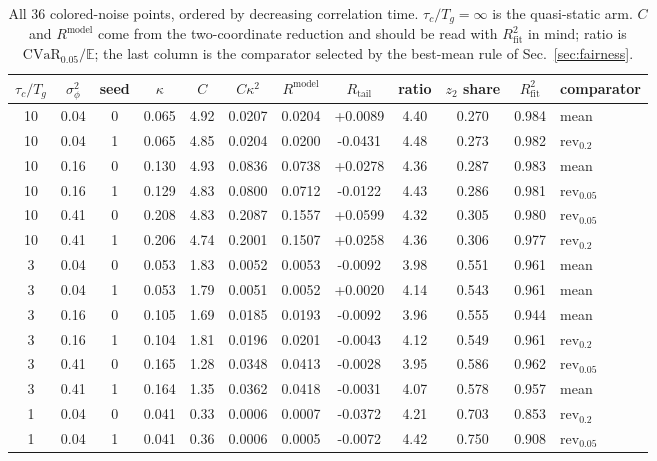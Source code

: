 \documentclass[aps,pra,onecolumn,notitlepage,superscriptaddress,nofootinbib,floatfix]{revtex4-2}
\newcommand{\cvar}{\mathrm{CVaR}}
\newcommand{\E}{\mathbb{E}}
\newcommand{\Rt}{R_{\mathrm{tail}}}
\newcommand{\Rm}{R^{\mathrm{model}}}
\begin{document}
\begin{table}[t]
\caption{All $36$ colored-noise points, ordered by decreasing correlation
time. $\tau_c/T_g=\infty$ is the quasi-static arm. $C$ and $\Rm$ come from the
two-coordinate reduction and should be read with $R^2_{\mathrm{fit}}$ in mind;
ratio is $\cvar_{0.05}/\E$; the last column is the comparator selected by the
best-mean rule of Sec.~\ref{sec:fairness}.}
\label{tab:stage4}
\begin{ruledtabular}
\begin{tabular}{ccccccccccc l}
$\tau_c/T_g$ & $\sigma_\phi^2$ & seed & $\kappa$ & $C$ & $C\kappa^2$ &
$\Rm$ & $\Rt$ & ratio & $z_2$ share & $R^2_{\mathrm{fit}}$ & comparator\\
\hline
10 & 0.04 & 0 & 0.065 & 4.92 & 0.0207 & 0.0204 & +0.0089 & 4.40 & 0.270 & 0.984 & mean\\
10 & 0.04 & 1 & 0.065 & 4.85 & 0.0204 & 0.0200 & -0.0431 & 4.48 & 0.273 & 0.982 & rev$_{0.2}$\\
10 & 0.16 & 0 & 0.130 & 4.93 & 0.0836 & 0.0738 & +0.0278 & 4.36 & 0.287 & 0.983 & mean\\
10 & 0.16 & 1 & 0.129 & 4.83 & 0.0800 & 0.0712 & -0.0122 & 4.43 & 0.286 & 0.981 & rev$_{0.05}$\\
10 & 0.41 & 0 & 0.208 & 4.83 & 0.2087 & 0.1557 & +0.0599 & 4.32 & 0.305 & 0.980 & rev$_{0.05}$\\
10 & 0.41 & 1 & 0.206 & 4.74 & 0.2001 & 0.1507 & +0.0258 & 4.36 & 0.306 & 0.977 & rev$_{0.2}$\\
3 & 0.04 & 0 & 0.053 & 1.83 & 0.0052 & 0.0053 & -0.0092 & 3.98 & 0.551 & 0.961 & mean\\
3 & 0.04 & 1 & 0.053 & 1.79 & 0.0051 & 0.0052 & +0.0020 & 4.14 & 0.543 & 0.961 & mean\\
3 & 0.16 & 0 & 0.105 & 1.69 & 0.0185 & 0.0193 & -0.0092 & 3.96 & 0.555 & 0.944 & mean\\
3 & 0.16 & 1 & 0.104 & 1.81 & 0.0196 & 0.0201 & -0.0043 & 4.12 & 0.549 & 0.961 & rev$_{0.2}$\\
3 & 0.41 & 0 & 0.165 & 1.28 & 0.0348 & 0.0413 & -0.0028 & 3.95 & 0.586 & 0.962 & rev$_{0.05}$\\
3 & 0.41 & 1 & 0.164 & 1.35 & 0.0362 & 0.0418 & -0.0031 & 4.07 & 0.578 & 0.957 & mean\\
1 & 0.04 & 0 & 0.041 & 0.33 & 0.0006 & 0.0007 & -0.0372 & 4.21 & 0.703 & 0.853 & rev$_{0.2}$\\
1 & 0.04 & 1 & 0.041 & 0.36 & 0.0006 & 0.0005 & -0.0072 & 4.42 & 0.750 & 0.908 & rev$_{0.05}$\\

\end{tabular}
\end{ruledtabular}
\end{table}
\end{document}
